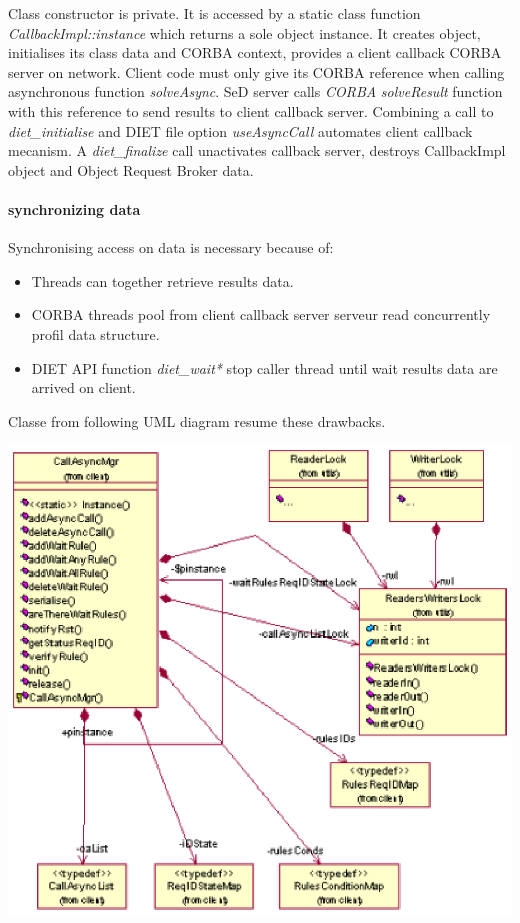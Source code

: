   Class constructor is private. It is accessed by a static class function
  \emph{CallbackImpl::instance} which returns a sole object instance. It 
  creates object, initialises its class data and CORBA context, provides a
  client callback CORBA server on network.
  Client code must only give its CORBA reference when calling asynchronous
  function \emph{solveAsync}.
  SeD server calls \emph{CORBA} \emph{solveResult} function with this 
  reference to send results to client callback server.
  Combining  a call to \emph{diet\_initialise} and DIET file option 
  \emph{useAsyncCall} automates client callback mecanism.
  A \emph{diet\_finalize} call unactivates callback server, destroys 
  CallbackImpl object and Object Request Broker data. 

  \paragraph{synchronizing data}
  Synchronising access on data is necessary because of:
  \begin{itemize}
  \item Threads can together retrieve results data.
  \item CORBA threads pool from client callback server serveur read concurrently
  profil data structure.
  \item DIET API function \emph{diet\_wait*} stop caller thread until wait 
  results data are arrived on client.
  \end{itemize}
  Classe from following UML diagram resume these drawbacks.

  \includegraphics{./fig/CallBackSynchronisationClassDiagram2.ps}

